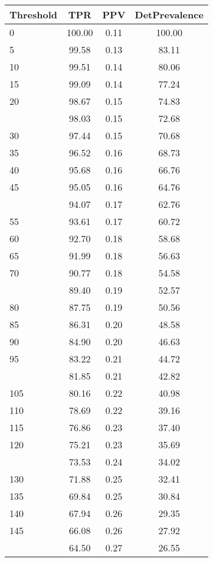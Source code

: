 \begin{table}[ht]
\centering
\begin{tabular}{lccc}
  \toprule
Threshold & TPR & PPV & DetPrevalence \\ 
  \midrule
0 & 100.00 & 0.11 & 100.00 \\ 
  5 & 99.58 & 0.13 & 83.11 \\ 
  10 & 99.51 & 0.14 & 80.06 \\ 
  15 & 99.09 & 0.14 & 77.24 \\ 
  20 & 98.67 & 0.15 & 74.83 \\ 
   \addlinespace
25 & 98.03 & 0.15 & 72.68 \\ 
  30 & 97.44 & 0.15 & 70.68 \\ 
  35 & 96.52 & 0.16 & 68.73 \\ 
  40 & 95.68 & 0.16 & 66.76 \\ 
  45 & 95.05 & 0.16 & 64.76 \\ 
   \addlinespace
50 & 94.07 & 0.17 & 62.76 \\ 
  55 & 93.61 & 0.17 & 60.72 \\ 
  60 & 92.70 & 0.18 & 58.68 \\ 
  65 & 91.99 & 0.18 & 56.63 \\ 
  70 & 90.77 & 0.18 & 54.58 \\ 
   \addlinespace
75 & 89.40 & 0.19 & 52.57 \\ 
  80 & 87.75 & 0.19 & 50.56 \\ 
  85 & 86.31 & 0.20 & 48.58 \\ 
  90 & 84.90 & 0.20 & 46.63 \\ 
  95 & 83.22 & 0.21 & 44.72 \\ 
   \addlinespace
100 & 81.85 & 0.21 & 42.82 \\ 
  105 & 80.16 & 0.22 & 40.98 \\ 
  110 & 78.69 & 0.22 & 39.16 \\ 
  115 & 76.86 & 0.23 & 37.40 \\ 
  120 & 75.21 & 0.23 & 35.69 \\ 
   \addlinespace
125 & 73.53 & 0.24 & 34.02 \\ 
  130 & 71.88 & 0.25 & 32.41 \\ 
  135 & 69.84 & 0.25 & 30.84 \\ 
  140 & 67.94 & 0.26 & 29.35 \\ 
  145 & 66.08 & 0.26 & 27.92 \\ 
   \addlinespace
150 & 64.50 & 0.27 & 26.55 \\ 

\end{tabular}
\end{table}
